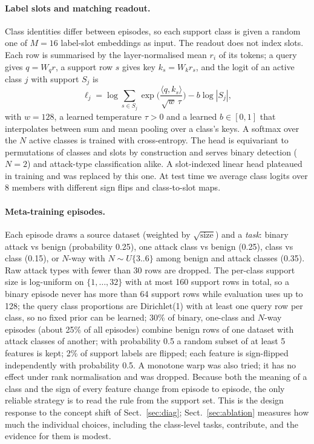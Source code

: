 \documentclass[11pt]{article}
\begin{document}
\paragraph{Label slots and matching readout.}
Class identities differ between episodes, so each support class is given a random one of $M=16$ label-slot embeddings as input.
The readout does not index slots.
Each row is summarised by the layer-normalised mean $r_i$ of its tokens; a query gives $q=W_q r$, a support row $s$ gives key $k_s=W_k r_s$, and the logit of an active class $j$ with support $S_j$ is
\begin{equation}
\ell_j=\log\!\!\sum_{s\in S_j}\exp\!\Big(\frac{\langle q,k_s\rangle}{\sqrt{w}\,\tau}\Big)-b\log|S_j|,
\end{equation}
with $w=128$, a learned temperature $\tau>0$ and a learned $b\in[0,1]$ that interpolates between sum and mean pooling over a class's keys.
A softmax over the $N$ active classes is trained with cross-entropy.
The head is equivariant to permutations of classes and slots by construction and serves binary detection ($N=2$) and attack-type classification alike.
A slot-indexed linear head plateaued in training and was replaced by this one.
At test time we average class logits over 8 members with different sign flips and class-to-slot maps.

\paragraph{Meta-training episodes.}
Each episode draws a source dataset (weighted by $\sqrt{\text{size}}$) and a \emph{task}: binary attack vs benign (probability 0.25), one attack class vs benign (0.25), class vs class (0.15), or $N$-way with $N\sim U\{3..6\}$ among benign and attack classes (0.35).
Raw attack types with fewer than 30 rows are dropped.
The per-class support size is log-uniform on $\{1,\dots,32\}$ with at most 160 support rows in total, so a binary episode never has more than 64 support rows while evaluation uses up to 128; the query class proportions are Dirichlet(1) with at least one query row per class, so no fixed prior can be learned; 30\% of binary, one-class and $N$-way episodes (about 25\% of all episodes) combine benign rows of one dataset with attack classes of another; with probability 0.5 a random subset of at least 5 features is kept; 2\% of support labels are flipped; each feature is sign-flipped independently with probability 0.5.
A monotone warp was also tried; it has no effect under rank normalisation and was dropped.
Because both the meaning of a class and the sign of every feature change from episode to episode, the only reliable strategy is to read the rule from the support set.
This is the design response to the concept shift of Sect.~\ref{sec:diag}; Sect.~\ref{sec:ablation} measures how much the individual choices, including the class-level tasks, contribute, and the evidence for them is modest.
\end{document}
